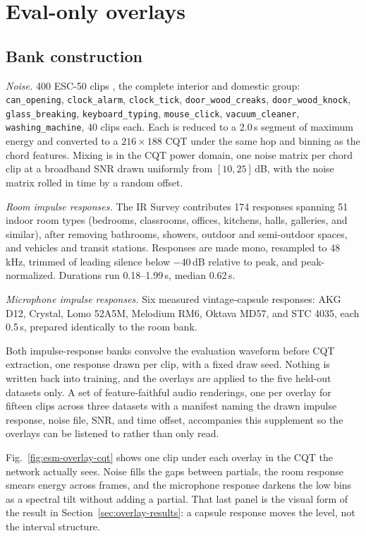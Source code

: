 \documentclass[pdflatex,sn-mathphys-num]{sn-jnl}
\begin{document}
\section{Eval-only overlays}\label{sec:overlays}

\subsection{Bank construction}\label{sec:banks}

\emph{Noise.} 400 ESC-50 clips \cite{Piczak2015}, the complete interior and domestic group: \texttt{can\_opening}, \texttt{clock\_alarm}, \texttt{clock\_tick}, \texttt{door\_wood\_creaks}, \texttt{door\_wood\_knock}, \texttt{glass\_breaking}, \texttt{keyboard\_typing}, \texttt{mouse\_click}, \texttt{vacuum\_cleaner}, \texttt{washing\_machine}, 40 clips each. Each is reduced to a 2.0\,s segment of maximum energy and converted to a $216\times188$ CQT under the same hop and binning as the chord features. Mixing is in the CQT power domain, one noise matrix per chord clip at a broadband SNR drawn uniformly from $[10,25]$\,dB, with the noise matrix rolled in time by a random offset.

\emph{Room impulse responses.} The IR Survey \cite{Traer2016} contributes 174 responses spanning 51 indoor room types (bedrooms, classrooms, offices, kitchens, halls, galleries, and similar), after removing bathrooms, showers, outdoor and semi-outdoor spaces, and vehicles and transit stations. Responses are made mono, resampled to 48\,kHz, trimmed of leading silence below $-40$\,dB relative to peak, and peak-normalized. Durations run 0.18--1.99\,s, median 0.62\,s.

\emph{Microphone impulse responses.} Six measured vintage-capsule responses: AKG D12, Crystal, Lomo 52A5M, Melodium RM6, Oktava MD57, and STC 4035, each 0.5\,s, prepared identically to the room bank.

Both impulse-response banks convolve the evaluation waveform before CQT extraction, one response drawn per clip, with a fixed draw seed. Nothing is written back into training, and the overlays are applied to the five held-out datasets only. A set of feature-faithful audio renderings, one per overlay for fifteen clips across three datasets with a manifest naming the drawn impulse response, noise file, SNR, and time offset, accompanies this supplement so the overlays can be listened to rather than only read.

Fig.~\ref{fig:esm-overlay-cqt} shows one clip under each overlay in the CQT the network actually sees. Noise fills the gaps between partials, the room response smears energy across frames, and the microphone response darkens the low bins as a spectral tilt without adding a partial. That last panel is the visual form of the result in Section~\ref{sec:overlay-results}: a capsule response moves the level, not the interval structure.
\end{document}
